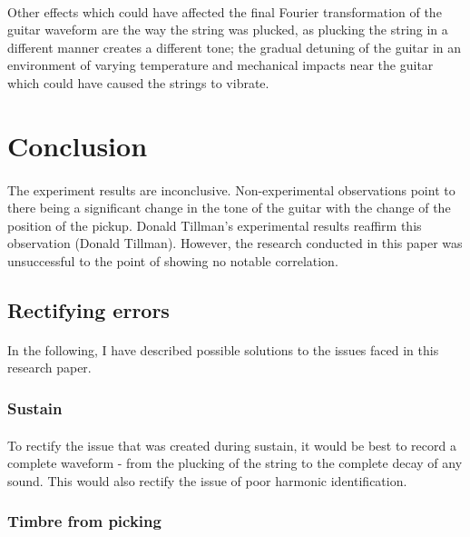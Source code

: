 \documentclass{article}
\begin{document}
\paragraph*{}
Other effects which could have affected the final Fourier transformation of 
the guitar waveform are the way the string was plucked, as plucking the string 
in a different manner creates a different tone; the gradual detuning of the 
guitar in an environment of varying temperature and mechanical impacts near 
the guitar which could have caused the strings to vibrate.

\section{Conclusion}

\paragraph*{}
The experiment results are inconclusive. Non-experimental observations point to 
there being a significant change in the tone of the guitar with the change of 
the position of the pickup. Donald Tillman's experimental results reaffirm 
this observation (Donald Tillman). However, the research conducted in this 
paper was unsuccessful to the point of showing no notable correlation.

\subsection{Rectifying errors}

\paragraph*{}
In the following, I have described possible solutions to the issues faced in 
this research paper.

\subsubsection{Sustain}
\paragraph*{}
To rectify the issue that was created during sustain, it would be best to 
record a complete waveform - from the plucking of the string to the complete 
decay of any sound. This would also rectify the issue of poor harmonic 
identification.

\subsubsection{Timbre from picking}
\end{document}
